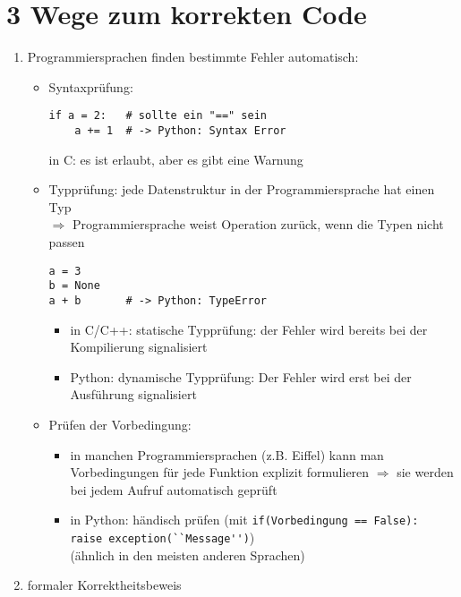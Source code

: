 \section{3 Wege zum korrekten Code}
    \begin{enumerate}
        \item Programmiersprachen finden bestimmte Fehler automatisch:
        \begin{itemize}
            \item Syntaxprüfung:
            \begin{verbatim}
if a = 2:   # sollte ein "==" sein
    a += 1  # -> Python: Syntax Error
            \end{verbatim}
            in C: es ist erlaubt, aber es gibt eine Warnung
            \item Typprüfung: jede Datenstruktur in der Programmiersprache hat einen Typ \\
            $\Rightarrow$ Programmiersprache weist Operation zurück, wenn die Typen nicht passen
            \begin{verbatim}
a = 3
b = None
a + b       # -> Python: TypeError
            \end{verbatim}
            \begin{itemize}
                \item in C/C++: statische Typprüfung: der Fehler wird bereits bei der Kompilierung signalisiert
                \item Python: dynamische Typprüfung: Der Fehler wird erst bei der Ausführung signalisiert
            \end{itemize}
            \item Prüfen der Vorbedingung:
            \begin{itemize}
                \item in manchen Programmiersprachen (z.B. Eiffel) kann man Vorbedingungen für jede Funktion explizit formulieren $\Rightarrow$ sie werden bei jedem Aufruf automatisch geprüft
                \item in Python: händisch prüfen (mit \verb|if(Vorbedingung == False): |\\ \verb|raise exception(``Message'')|)\\
                (ähnlich in den meisten anderen Sprachen)
            \end{itemize}
        \end{itemize}
        \item formaler Korrektheitsbeweis \\

\end{enumerate}
